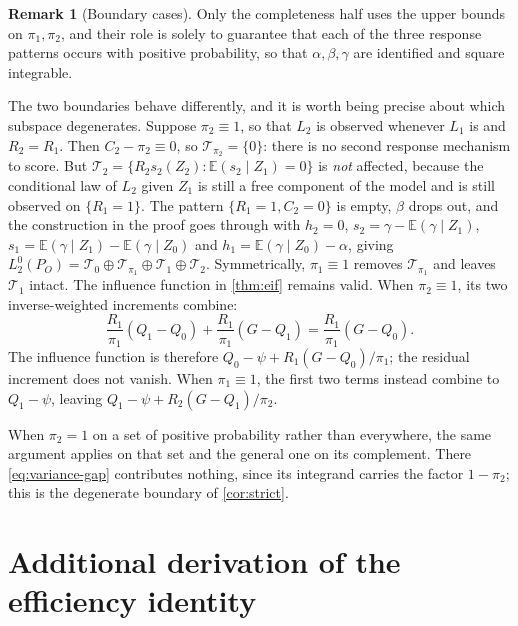 \documentclass[11pt]{article}
\theoremstyle{definition}
\newtheorem{remark}{Remark}
\newcommand{\E}{\mathbb{E}}
\newcommand{\1}{\mathbf{1}}
\begin{document}
\begin{remark}[Boundary cases]\label{rem:boundary}
Only the completeness half uses the upper bounds on $\pi_1,\pi_2$, and their
role is solely to guarantee that each of the three response patterns occurs
with positive probability, so that $\alpha,\beta,\gamma$ are identified and
square integrable.

The two boundaries behave differently, and it is worth being precise about
which subspace degenerates. Suppose $\pi_2\equiv1$, so that $L_2$ is observed
whenever $L_1$ is and $R_2=R_1$. Then $C_2-\pi_2\equiv0$, so
$\mathcal T_{\pi_2}=\{0\}$: there is no second response mechanism to score.
But $\mathcal T_2=\{R_2s_2(Z_2):\E(s_2\mid Z_1)=0\}$ is \emph{not} affected,
because the conditional law of $L_2$ given $Z_1$ is still a free component of
the model and is still observed on $\{R_1=1\}$. The pattern
$\{R_1=1,C_2=0\}$ is empty, $\beta$ drops out, and the construction in the proof
goes through with $h_2=0$, $s_2=\gamma-\E(\gamma\mid Z_1)$,
$s_1=\E(\gamma\mid Z_1)-\E(\gamma\mid Z_0)$ and $h_1=\E(\gamma\mid Z_0)-\alpha$,
giving $L_2^0(P_O)=\mathcal T_0\oplus\mathcal T_{\pi_1}\oplus\mathcal T_1
\oplus\mathcal T_2$. Symmetrically, $\pi_1\equiv1$ removes
$\mathcal T_{\pi_1}$ and leaves $\mathcal T_1$ intact. The influence function in \cref{thm:eif} remains valid. When $\pi_2\equiv1$, its two inverse-weighted increments combine:
\[
\frac{R_1}{\pi_1}(Q_1-Q_0)+\frac{R_1}{\pi_1}(G-Q_1)
=\frac{R_1}{\pi_1}(G-Q_0).
\]
The influence function is therefore $Q_0-\psi+R_1(G-Q_0)/\pi_1$; the residual increment does not vanish. When $\pi_1\equiv1$, the first two terms instead combine to $Q_1-\psi$, leaving $Q_1-\psi+R_2(G-Q_1)/\pi_2$.

When $\pi_2=1$ on a set of positive probability rather than everywhere, the same
argument applies on that set and the general one on its complement. There
\cref{eq:variance-gap} contributes nothing, since its integrand carries the
factor $1-\pi_2$; this is the degenerate boundary of \cref{cor:strict}.
\end{remark}

\section{Additional derivation of the efficiency identity}\label{app:efficiency}
\end{document}
